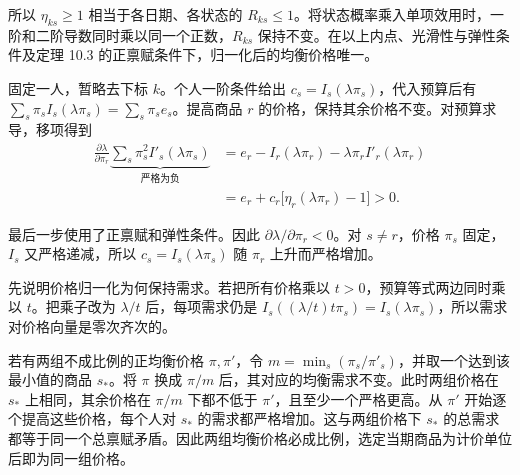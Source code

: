 所以 $\eta_{ks}\ge1$ 相当于各日期、各状态的 $R_{ks}\le1$。将状态概率乘入单项效用时，一阶和二阶导数同时乘以同一个正数，$R_{ks}$ 保持不变。在以上内点、光滑性与弹性条件及定理 10.3 的正禀赋条件下，归一化后的均衡价格唯一。

\begin{solution}[label-content={证明},blank-type=none]
固定一人，暂略去下标 $k$。个人一阶条件给出 $c_s=I_s(\lambda\pi_s)$，代入预算后有 $\sum_s\pi_s I_s(\lambda\pi_s)=\sum_s\pi_s e_s$。提高商品 $r$ 的价格，保持其余价格不变。对预算求导，移项得到
\[
 \begin{aligned}
 \frac{\partial\lambda}{\partial\pi_r}
       \underbrace{\sum_s\pi_s^2 I'_s(\lambda\pi_s)}_{\text{严格为负}}
 &=e_r-I_r(\lambda\pi_r)-\lambda\pi_r I'_r(\lambda\pi_r)\\
 &=e_r+c_r\bigl[\eta_r(\lambda\pi_r)-1\bigr]>0.
 \end{aligned}
\]

最后一步使用了正禀赋和弹性条件。因此 $\partial\lambda/\partial\pi_r<0$。对 $s\ne r$，价格 $\pi_s$ 固定，$I_s$ 又严格递减，所以 $c_s=I_s(\lambda\pi_s)$ 随 $\pi_r$ 上升而严格增加。

先说明价格归一化为何保持需求。若把所有价格乘以 $t>0$，预算等式两边同时乘以 $t$。把乘子改为 $\lambda/t$ 后，每项需求仍是 $I_s((\lambda/t)t\pi_s)=I_s(\lambda\pi_s)$，所以需求对价格向量是零次齐次的。

若有两组不成比例的正均衡价格 $\pi,\pi'$，令 $m=\min_s(\pi_s/\pi'_s)$，并取一个达到该最小值的商品 $s_*$。将 $\pi$ 换成 $\pi/m$ 后，其对应的均衡需求不变。此时两组价格在 $s_*$ 上相同，其余价格在 $\pi/m$ 下都不低于 $\pi'$，且至少一个严格更高。从 $\pi'$ 开始逐个提高这些价格，每个人对 $s_*$ 的需求都严格增加。这与两组价格下 $s_*$ 的总需求都等于同一个总禀赋矛盾。因此两组均衡价格必成比例，选定当期商品为计价单位后即为同一组价格。
\end{solution}


